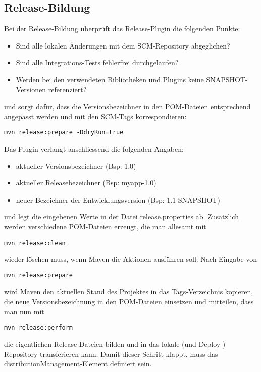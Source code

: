 \subsection{Release-Bildung}
Bei der Release-Bildung überprüft das Release-Plugin die folgenden Punkte:
\begin{itemize}
\item Sind alle lokalen Änderungen mit dem SCM-Repository abgeglichen?
\item Sind alle Integrations-Tests fehlerfrei durchgelaufen?
\item Werden bei den verwendeten Bibliotheken und Plugins
  keine SNAPSHOT-Versionen referenziert?
\end{itemize}
und sorgt dafür, dass die Versionsbezeichner in den POM-Dateien
entsprechend angepasst werden und mit den SCM-Tags korrespondieren:
\begin{lstlisting}
mvn release:prepare -DdryRun=true
\end{lstlisting}
\newslide
Das Plugin verlangt anschliessend die folgenden Angaben:
\begin{itemize}
\item aktueller Versionsbezeichner (Bsp: 1.0)
\item aktueller Releasebezeichner (Bsp: myapp-1.0)
\item neuer Bezeichner der Entwicklungsversion (Bsp: 1.1-SNAPSHOT)
\end{itemize}
und legt die eingebenen Werte in der Datei release.properties
ab. Zusätzlich werden verschiedene POM-Dateien erzeugt, die man
allesamt mit
\begin{lstlisting}
mvn release:clean
\end{lstlisting}
wieder löschen muss, wenn Maven die Aktionen ausführen soll.
\newslide
Nach Eingabe von
\begin{lstlisting}
mvn release:prepare
\end{lstlisting}
%
%
wird Maven den aktuellen Stand des Projektes in das Tags-Verzeichnis
kopieren, die neue Versionsbezeichnung
in den POM-Dateien einsetzen und mitteilen, dass man nun mit
\begin{lstlisting}
mvn release:perform
\end{lstlisting}
die eigentlichen Release-Dateien bilden und in das lokale (und
Deploy-) Repository
transferieren kann. Damit dieser Schritt klappt, muss das
distributionManagement-Element definiert sein.
%

